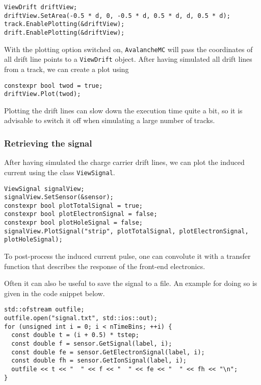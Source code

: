 \begin{lstlisting}
ViewDrift driftView;
driftView.SetArea(-0.5 * d, 0, -0.5 * d, 0.5 * d, d, 0.5 * d);
track.EnablePlotting(&driftView);
drift.EnablePlotting(&driftView);
\end{lstlisting}
With the plotting option switched on, \texttt{AvalancheMC} 
will pass the coordinates of all drift line points 
to a \texttt{ViewDrift} object. 
After having simulated all drift lines from a track, we can create a plot using
\begin{lstlisting}
constexpr bool twod = true;
driftView.Plot(twod);
\end{lstlisting}
Plotting the drift lines can slow down the execution time quite a bit, so it is advisable to switch it off when simulating a large number of tracks.

\subsubsection{Retrieving the signal}
After having simulated the charge carrier drift lines, 
we can plot the induced current using the class \texttt{ViewSignal}.
\begin{lstlisting}
ViewSignal signalView;
signalView.SetSensor(&sensor);
constexpr bool plotTotalSignal = true;
constexpr bool plotElectronSignal = false;
constexpr bool plotHoleSignal = false;
signalView.PlotSignal("strip", plotTotalSignal, plotElectronSignal, plotHoleSignal);
\end{lstlisting}

To post-process the induced current pulse, one can convolute 
it with a transfer function that describes the response 
of the front-end electronics.

Often it can also be useful to save the signal to a file. 
An example for doing so is given in the code snippet below.
\begin{lstlisting}
std::ofstream outfile;
outfile.open("signal.txt", std::ios::out);
for (unsigned int i = 0; i < nTimeBins; ++i) {
  const double t = (i + 0.5) * tstep;
  const double f = sensor.GetSignal(label, i);
  const double fe = sensor.GetElectronSignal(label, i);
  const double fh = sensor.GetIonSignal(label, i);
  outfile << t << "  " << f << "  " << fe << "  " << fh << "\n";
}
\end{lstlisting}

